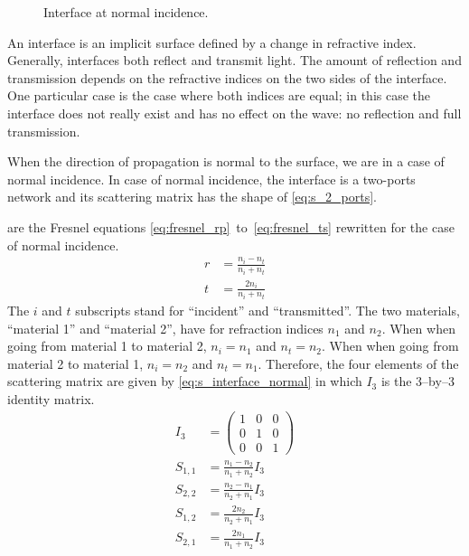 \begin{figure}[hbtp]
    \centering
    \caption{\label{fig:net_interface_normal}Interface at normal incidence.}
\end{figure}
An interface is an implicit surface defined by a change in refractive index.
Generally, interfaces both reflect and transmit light.
The amount of reflection and transmission depends on the refractive indices on the two sides of the interface.
One particular case is the case where both indices are equal; in this case the interface does not really exist and has no effect on the wave: no reflection and full transmission.

When the direction of propagation is normal to the surface, we are in a case of normal incidence.
In case of normal incidence, the interface is a two-ports network and its scattering matrix has the shape of \cref{eq:s_2_ports}.

 are the Fresnel equations \eqref{eq:fresnel_rp}~to~\eqref{eq:fresnel_ts} rewritten for the case of normal incidence.
\begin{subequations}
    \begin{align}
        r &= \frac{n_i - n_t}{n_i + n_t} \label{eq:fresnel_normal_r}\\
        t &= \frac{2 n_i}{n_i + n_t} \label{eq:fresnel_normal_t}
    \end{align}
    \label{eq:fresnel_normal}
\end{subequations}
The $i$ and $t$ subscripts stand for ``incident'' and ``transmitted''.
The two materials, ``material 1'' and ``material 2'', have for refraction indices $n_1$ and $n_2$.
When when going from material 1 to material 2, $n_i = n_1$ and $n_t = n_2$.
When when going from material 2 to material 1, $n_i = n_2$ and $n_t = n_1$.
Therefore, the four elements of the scattering matrix are given by \cref{eq:s_interface_normal} in which $I_3$ is the 3--by--3 identity matrix.
\begin{subequations}
    \begin{align}
        I_3 &= \begin{pmatrix} 1&0&0\\0&1&0\\0&0&1 \end{pmatrix}
        \\
        S_{1, 1} &= \frac{n_1 - n_2}{n_1 + n_2} I_3
        \\
        S_{2, 2} &= \frac{n_2 - n_1}{n_2 + n_1} I_3
        \\
        S_{1, 2} &= \frac{2 n_2}{n_2 + n_1} I_3
        \\
        S_{2, 1} &= \frac{2 n_1}{n_1 + n_2} I_3
    \end{align}
    \label{eq:s_interface_normal}
\end{subequations}

